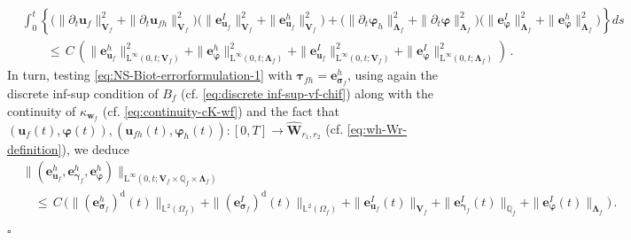 \documentclass[11pt]{article}
\numberwithin{equation}{section}
\newcommand{\ds}{\displaystyle}
\newcommand{\bgamma}{{\boldsymbol\gamma}}
\newcommand{\bLambda}{{\boldsymbol\Lambda}}
\newcommand{\bsi}{{\boldsymbol\sigma}}
\newcommand{\bvarphi}{{\boldsymbol\varphi}}
\newcommand{\btau}{{\boldsymbol\tau}}
\newcommand{\bw}{{\mathbf{w}}}
\newcommand{\bu}{\mathbf{u}}
\newcommand{\be}{{\mathbf{e}}}
\newcommand{\0}{{\mathbf{0}}}
\def\bV{\mathbf{V}}
\def\bW{\mathbf{W}}
\newcommand\bbQ{\mathbb{Q}}
\newcommand\bbL{\mathbb{L}}
\def\L{\mathrm{L}}
\def\rd{\mathrm{d}}
\def\wh{\widehat}
\newenvironment{proof}{\noindent{\it Proof.}}{\hfill$\square$}
\numberwithin{equation}{section}
\begin{document}
\begin{proof}
\begin{align}\label{eq:eh-uf-varphi-bound}
&\ds \int_0^t \left\{ \big( \|\partial_t \bu_f\|_{\bV_f}^2 + \|\partial_t \bu_{fh}\|_{\bV_f}^2 \big) 
\big( \|\be_{\bu_f}^I\|_{\bV_f}^2 + \|\be_{\bu_f}^h\|_{\bV_f}^2 \big) 
+ \big(\|\partial_t\bvarphi_{h}\|^2_{\bLambda_f} + \|\partial_t\bvarphi\|^2_{\bLambda_f}\big)\big(\|\be_{\bvarphi}^I\|^2_{\bLambda_f} + \|\be_{\bvarphi}^h\|^2_{\bLambda_f} \big) \right\} ds \nonumber \\[3ex]
&\ds\qquad \leq\, C\,\left(  
\|\be_{\bu_f}^h\|_{\L^{\infty}(0,t;\bV_f)}^2
+ \|\be_{\bvarphi}^h\|_{\L^{\infty}(0,t;\bLambda_f)}^2
+ \|\be_{\bu_f}^I\|_{\L^{\infty}(0,t;\bV_f)}^2
+ \|\be_{\bvarphi}^I\|_{\L^{\infty}(0,t;\bLambda_f)}^2 \right) \,.
\end{align}
%
In turn, testing \eqref{eq:NS-Biot-errorformulation-1} with $\btau_{fh} = \be_{\bsi_f}^h$, using again the discrete inf-sup condition of $B_f$ (cf. \eqref{eq:discrete inf-sup-vf-chif}) along with the continuity of  $\kappa_{\bw_f}$ (cf. \eqref{eq:continuity-cK-wf}) and the fact that $(\bu_f(t),\bvarphi(t)),(\bu_{fh}(t),\bvarphi_{h}(t)):[0,T]\to \wh{\bW}_{r_1,r_2}$ (cf. \eqref{eq:wh-Wr-definition}), we deduce
\begin{align}
&\|(\be_{\bu_{f}}^h, \be_{\bgamma_{f}}^h, \be_{\bvarphi}^h)\|_{\L^\infty(0,t;\bV_f\times \bbQ_f\times\bLambda_f)} \nonumber \\
&\quad \leq\, C\,\Big( \|(\be_{\bsi_f}^h)^\rd(t)\|_{\bbL^2(\Omega_f)} +  \|(\be_{\bsi_f}^I)^\rd(t)\|_{\bbL^2(\Omega_f)} + \|\be_{\bu_f}^I(t)\|_{\bV_f}
+ \|\be_{\bgamma_f}^I(t)\|_{\bbQ_f} + \|\be_{\bvarphi}^I(t)\|_{\bLambda_f} \Big) \,. \label{eq: error equation 7}
\end{align}	


\end{proof}
\end{document}
